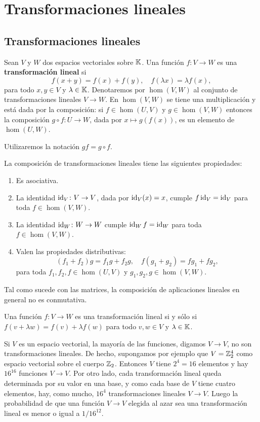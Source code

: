 \chapter{Transformaciones lineales}

\section{Transformaciones lineales}

\begin{block}
    Sean $V$ y $W$ dos espacios vectoriales sobre $\mathbb{K}$. Una función $f\colon V\to W$ 
    es una \textbf{transformación lineal} si 
    \[
        f(x+y)=f(x)+f(y),\quad
        f(\lambda x)=\lambda f(x),
    \]
	para todo $x,y\in V$ y $\lambda\in\mathbb{K}$. Denotaremos por $\hom(V,W)$ al
	conjunto de transformaciones lineales $V\to W$.  En $\hom(V,W)$ se tiene
	una multiplicación y está dada por la composición: si $f\in\hom(U,V)$ y
	$g\in\hom(V,W)$ entonces la composición $g\circ f\colon U\to W$, dada por
	$x\mapsto g(f(x))$, es un elemento de $\hom(U,W)$. 
    
    Utilizaremos la notación $gf=g\circ f$. 
    
    La composición de transformaciones lineales tiene las siguientes
    propiedades:
    \begin{enumerate}
        \item Es asociativa.
        \item La identidad $\operatorname{id}_V\colon V\to V$, dada por $\operatorname{id}_V(x)=x$, cumple
            $f\operatorname{id}_V=\operatorname{id}_V$ para toda $f\in\hom(V,W)$. 
        \item La identidad $\operatorname{id}_W\colon W\to W$ cumple $\operatorname{id}_Wf=\operatorname{id}_W$ para toda
            $f\in\hom(V,W)$. 
        \item Valen las propiedades distributivas:
            \[
            (f_1+f_2)g=f_1g+f_2g,\quad
            f(g_1+g_2)=fg_1+fg_2,
            \]
            para toda $f_1,f_2,f\in\hom(U,V)$ y $g_1,g_2,g\in\hom(V,W)$.
    \end{enumerate}
    Tal como sucede con las matrices, la composición de aplicaciones lineales
    en general no es conmutativa. 
\end{block}

\begin{xca}
	Una función $f\colon V\to W$ es una transformación lineal si y sólo si
	$f(v+\lambda w)=f(v)+\lambda f(w)$ para todo $v,w\in V$ y $\lambda\in\mathbb{K}$.
\end{xca}

\begin{block}
    Si $V$ es un espacio vectorial, la mayoría de las funciones, digamos $V\to
    V$, no son transformaciones lineales.  De hecho, supongamos por ejemplo que
    $V=\mathbb{Z}_2^4$ como espacio vectorial sobre el cuerpo $\mathbb{Z}_2$. Entonces $V$
    tiene $2^4=16$ elementos y hay $16^{16}$ funciones $V\to V$. Por otro lado, cada
    transformación lineal queda determinada por su valor en una base, y como cada base de $V$ 
    tiene cuatro elementos, hay, como mucho, $16^4$ transformaciones lineales $V\to V$. Luego
    la probabilidad de que una función $V\to V$ elegida al azar sea una transformación lineal
    es menor o igual a $1/16^{12}$.
\end{block}


